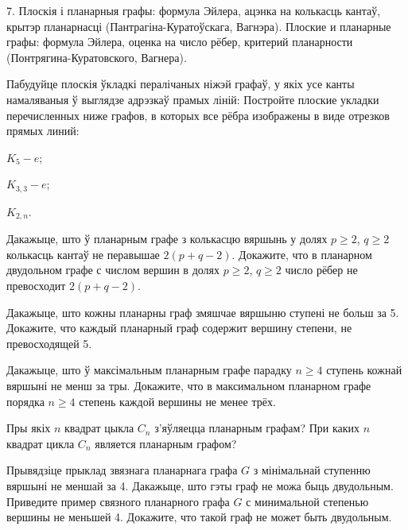 \documentclass[12pt, a4paper]{article}
\begin{document}
    
\biLangHeader
{7. Плоскія і планарныя графы: формула Эйлера, ацэнка на колькасць кантаў, крытэр планарнасці (Пантрагіна-Куратоўскага, Вагнэра).}
{Плоские и планарные графы: формула Эйлера, оценка на число рёбер, критерий планарности (Понтрягина-Куратовского, Вагнера).}

\begin{problemList}

\problemItemWithCommonPart
{Пабудуйце плоскія ўкладкі пералічаных ніжэй графаў, у якіх усе канты намаляваныя ў выглядзе адрэзкаў прамых ліній:}
{Постройте плоские укладки перечисленных ниже графов, в которых все рёбра изображены в виде отрезков прямых линий:}
{%
\begin{belarusianEnumerate}
    \item $K_5-e$;
    \item $K_{3, 3}-e$;
    \item $K_{2, n}$.
\end{belarusianEnumerate}
}

\smallskip

\problemItemSimple
{Дакажыце, што ў планарным графе з колькасцю вяршынь у долях $p\ge 2$, $q\ge 2$ колькасць кантаў не перавышае $2(p+q-2)$.}
{Докажите, что в планарном двудольном графе с числом вершин в долях $p\ge 2$, $q\ge 2$ число рёбер не превосходит $2(p+q-2)$.}

\bigskip

\problemItemSimple
{Дакажыце, што кожны планарны граф змяшчае вяршыню ступені не больш за 5.}
{Докажите, что каждый планарный граф содержит вершину степени, не превосходящей 5.}

\bigskip

\problemItemSimple
{Дакажыце, што ў максімальным планарным графе парадку $n\ge 4$ ступень кожнай вяршыні не менш за тры.}
{Докажите, что в максимальном планарном графе порядка $n\ge 4$ степень каждой вершины не менее трёх.}

\bigskip

\problemItemSimple
{Пры якіх $n$ квадрат цыкла $C_n$ з'яўляецца планарным графам?}
{При каких $n$ квадрат цикла $C_n$ является планарным графом?}

\bigskip

\problemItemSimple
{Прывядзіце прыклад звязнага планарнага графа $G$ з мінімальнай ступенню вяршыні не меншай за 4.
Дакажыце, што гэты граф не можа быць двудольным.}
{Приведите пример связного планарного графа $G$ с минимальной степенью вершины не меньшей 4.
Докажите, что такой граф не может быть двудольным.}


\end{problemList}
\end{document}
